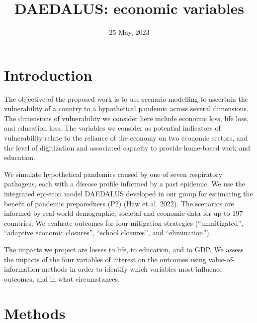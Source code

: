 \documentclass[
]{article}
\title{DAEDALUS: economic variables}
\author{}
\date{\vspace{-2.5em}25 May, 2023}
\begin{document}
\maketitle

{
\setcounter{tocdepth}{5}
\tableofcontents
}
\pagestyle{plain}


\newpage

\hypertarget{introduction}{%
\section{Introduction}\label{introduction}}

The objective of the proposed work is to use scenario modelling to ascertain the vulnerability of a country to a hypothetical pandemic across several dimensions. The dimensions of vulnerability we consider here include economic loss, life loss, and education loss. The variables we consider as potential indicators of vulnerability relate to the reliance of the economy on two economic sectors, and the level of digitization and associated capacity to provide home-based work and education.

We simulate hypothetical pandemics caused by one of seven respiratory pathogens, each with a disease profile informed by a past epidemic. We use the integrated epi-econ model DAEDALUS developed in our group for estimating the benefit of pandemic preparedness (P2) (Haw et al. 2022). The scenarios are informed by real-world demographic, societal and economic data for up to 197 countries. We evaluate outcomes for four mitigation strategies (``unmitigated'', ``adaptive economic closures'', ``school closures'', and ``elimination'').

The impacts we project are losses to life, to education, and to GDP. We assess the impacts of the four variables of interest on the outcomes using value-of-information methods in order to identify which variables most influence outcomes, and in what circumstances.

\hypertarget{methods}{%
\section{Methods}\label{methods}}
\end{document}
